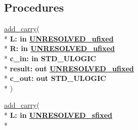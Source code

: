 \subsection*{Procedures}
 \begin{DoxyCompactItemize}
\item 
{\bfseries {\bfseries \textcolor{vhdlchar}{ }}} \hyperlink{classfixed__pkg_abf0ec41fde696894c1f3a895e1156a1b}{add\+\_\+carry}( \\*
{\bfseries \textcolor{vhdlchar}{ }\textcolor{vhdlchar}{L\+: }\textcolor{stringliteral}{} {\bfseries \textcolor{keywordflow}{in}\textcolor{vhdlchar}{ }{\bfseries \hyperlink{classfixed__pkg_ae78bc2b36d22f6abeac163955e8a587d}{U\+N\+R\+E\+S\+O\+L\+V\+E\+D\+\_\+ufixed}} \textcolor{vhdlchar}{ }}}\\*
  {\bfseries \textcolor{vhdlchar}{ }\textcolor{vhdlchar}{R\+: }\textcolor{stringliteral}{} {\bfseries \textcolor{keywordflow}{in}\textcolor{vhdlchar}{ }{\bfseries \hyperlink{classfixed__pkg_ae78bc2b36d22f6abeac163955e8a587d}{U\+N\+R\+E\+S\+O\+L\+V\+E\+D\+\_\+ufixed}} \textcolor{vhdlchar}{ }}}\\*
  {\bfseries \textcolor{vhdlchar}{ }\textcolor{vhdlchar}{c\+\_\+in\+: }\textcolor{stringliteral}{} {\bfseries \textcolor{keywordflow}{in}\textcolor{vhdlchar}{ }\textcolor{comment}{S\+T\+D\+\_\+\+U\+L\+O\+G\+I\+C}\textcolor{vhdlchar}{ }}}\\*
  {\bfseries \textcolor{vhdlchar}{ }\textcolor{vhdlchar}{result\+: }\textcolor{stringliteral}{} {\bfseries \textcolor{keywordflow}{out}\textcolor{vhdlchar}{ }{\bfseries \hyperlink{classfixed__pkg_ae78bc2b36d22f6abeac163955e8a587d}{U\+N\+R\+E\+S\+O\+L\+V\+E\+D\+\_\+ufixed}} \textcolor{vhdlchar}{ }}}\\*
  {\bfseries \textcolor{vhdlchar}{ }\textcolor{vhdlchar}{c\+\_\+out\+: }\textcolor{stringliteral}{} {\bfseries \textcolor{keywordflow}{out}\textcolor{vhdlchar}{ }\textcolor{comment}{S\+T\+D\+\_\+\+U\+L\+O\+G\+I\+C}\textcolor{vhdlchar}{ }}}\\*
   )
\item 
{\bfseries {\bfseries \textcolor{vhdlchar}{ }}} \hyperlink{classfixed__pkg_abf0ec41fde696894c1f3a895e1156a1b}{add\+\_\+carry}( \\*
{\bfseries \textcolor{vhdlchar}{ }\textcolor{vhdlchar}{L\+: }\textcolor{stringliteral}{} {\bfseries \textcolor{keywordflow}{in}\textcolor{vhdlchar}{ }{\bfseries \hyperlink{classfixed__pkg_aa723b28a027c3c0f9bca02d75e8df4d6}{U\+N\+R\+E\+S\+O\+L\+V\+E\+D\+\_\+sfixed}} \textcolor{vhdlchar}{ }}}\\*

\end{DoxyCompactItemize}
